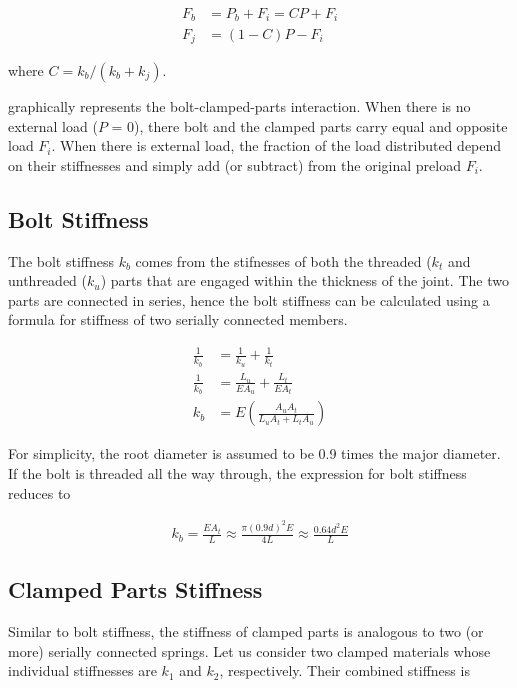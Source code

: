\documentclass[
10pt,
a4paper,
openany,
svgnames,
]{book}
\begin{document}
\begin{align} \label{eqn: bolt-joint interaction}
  F_b &= P_b + F_i = CP + F_i \\
  F_j &= (1 - C)P - F_i
\end{align}

where $C = k_b/(k_b + k_j)$.

 graphically represents the bolt-clamped-parts interaction. When there is no external load ($P$ = 0), there bolt and the clamped parts carry equal and opposite load $F_i$. When there is external load, the fraction of the load distributed depend on their stiffnesses and simply add (or subtract) from the original preload $F_i$.

\subsection{Bolt Stiffness}

The bolt stiffness $k_b$ comes from the stifnesses of both the threaded ($k_t$ and unthreaded ($k_u$) parts that are engaged within the thickness of the joint. The two parts are connected in series, hence the bolt stiffness can be calculated using a formula for stiffness of two serially connected members.

\begin{align}
  \frac{1}{k_b} &= \frac{1}{k_u} + \frac{1}{k_{t}} \nonumber \\ 
  \frac{1}{k_b} &= \frac{L_u}{EA_u} + \frac{L_{t}}{EA_{t}} \nonumber \\ 
  k_b &= E\left( \frac{A_uA_{t}}{L_uA_{t} + L_{t}A_u} \right) 
\end{align}

For simplicity, the root diameter is assumed to be 0.9 times the major diameter. If the bolt is threaded all the way through, the expression for bolt stiffness reduces to

\begin{align}
  k_b = \frac{EA_t}{L} \approx \frac{\pi (0.9d)^2 E}{4L} \approx \frac{0.64d^2E}{L}  \label{eqn: bolt stiffness}
\end{align}

\subsection{Clamped Parts Stiffness}

Similar to bolt stiffness, the stiffness of clamped parts is analogous to two (or more) serially connected springs. Let us consider two clamped materials whose individual stiffnesses are $k_1$ and $k_2$, respectively. Their combined stiffness is
\end{document}
